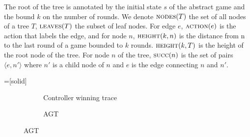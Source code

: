 The root of the tree is annotated by the initial state $s$ of the abstract game
and the bound $k$ on the number of rounds.  We denote $\textsc{nodes}(T)$ the
set of all nodes of a tree $T$, $\textsc{leaves}(T)$ the subset of leaf nodes.
For edge $e$, $\textsc{action}(e)$ is the action that labels the edge, and for
node $n$, $\textsc{height}(k, n)$ is the distance from n to the last round of a
game bounded to $k$ rounds.  $\textsc{height}(k, T)$ is the height of the root
node of the tree.  For node $n$ of the tree, $\textsc{succ}(n)$ is the set of
pairs $\langle e, n' \rangle$ where $n'$ is a child node of $n$ and $e$ is the
edge connecting $n$ and $n'$.

=[solid]
\begin{figure}
    \centering
    \captionsetup[subfigure]{width=\textwidth,justification=raggedleft}
    \begin{subfigure}[t]{.4\textwidth}
        \centering
        \begin{minipage}[t][3.8cm][t]{\textwidth}
    \end{minipage}
        \caption{Controller winning trace}
        \label{fig:trace}
    \end{subfigure}
    \begin{subfigure}[t]{.4\textwidth}
        \centering
        \begin{minipage}[t][3.8cm][t]{\textwidth}
        \end{minipage}
        \caption{AGT}
        \label{fig:agt}
    \end{subfigure}


\end{figure}
